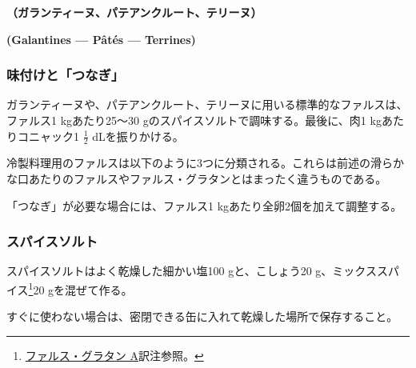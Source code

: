 \vspace{-1.5\zw}
\begin{center}
\textbf{（ガランティーヌ、パテアンクルート、テリーヌ）}
\end{center}
\vspace{.5\zw}
\begin{center}
\vspace{-1\zw}
\hspace{1\zw}\textbf{(Galantines --- Pâtés --- Terrines)}
\end{center}


\normalfont
\begin{recette}
\hypertarget{assaisonnement-et-liaison}{%
\subsubsection{味付けと「つなぎ」}\label{assaisonnement-et-liaison}}


ガランティーヌや、パテアンクルート、テリーヌに用いる標準的なファルスは、ファルス1
kgあたり25〜30 gのスパイスソルトで調味する。最後に、肉1
kgあたりコニャック1 \(\frac{1}{2}\) dLを振りかける。

冷製料理用のファルスは以下のように3つに分類される。これらは前述の滑らかな口あたりのファルスやファルス・グラタンとはまったく違うものである。

「つなぎ」が必要な場合には、ファルス1 kgあたり全卵2個を加えて調整する。

\hypertarget{sel-epice}{%
\subsubsection{スパイスソルト}\label{sel-epice}}


 

スパイスソルトはよく乾燥した細かい塩100 gと、こしょう20
g、ミックススパイス\footnote{\protect\hyperlink{farce-gratin-a}{ファルス・グラタン
  A}訳注参照。}20 gを混ぜて作る。

すぐに使わない場合は、密閉できる缶に入れて乾燥した場所で保存すること。

\hypertarget{farce-froide-a}{%
}
\end{recette}
